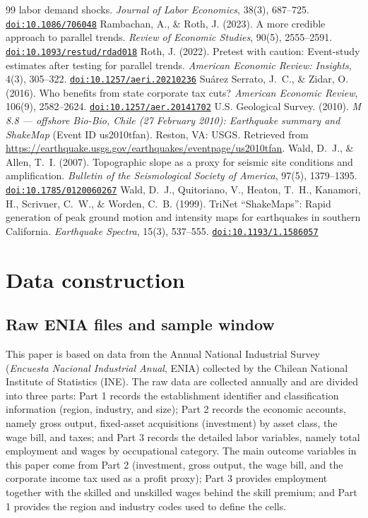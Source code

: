 \documentclass[12pt]{article}
\newcommand{\doi}[1]{\href{https://doi.org/#1}{\texttt{doi:#1}}}
\begin{document}
\begin{thebibliography}{99}
labor demand shocks. \textit{Journal of Labor Economics}, 38(3), 687--725.
\doi{10.1086/706048}
 Rambachan, A., \& Roth, J. (2023). A more
credible approach to parallel trends. \textit{Review of Economic Studies}, 90(5), 2555--2591.
\doi{10.1093/restud/rdad018}
 Roth, J. (2022). Pretest with caution: Event-study estimates
after testing for parallel trends. \textit{American Economic Review: Insights}, 4(3), 305--322.
\doi{10.1257/aeri.20210236}
 Su\'arez Serrato, J.~C., \& Zidar,
O. (2016). Who benefits from state corporate tax cuts? \textit{American Economic Review},
106(9), 2582--2624. \doi{10.1257/aer.20141702}
 U.S. Geological Survey. (2010). \textit{M 8.8 ---
offshore Bio-Bio, Chile (27 February 2010): Earthquake summary and ShakeMap} (Event ID us2010tfan). Reston, VA: USGS. Retrieved from \url{https://earthquake.usgs.gov/earthquakes/eventpage/us2010tfan}.
 Wald, D.~J., \& Allen, T.~I. (2007). Topographic
slope as a proxy for seismic site conditions and amplification. \textit{Bulletin of the
Seismological Society of America}, 97(5), 1379--1395. \doi{10.1785/0120060267}
 Wald, D.~J., Quitoriano, V., Heaton, T.~H., Kanamori, H.,
Scrivner, C.~W., \& Worden, C.~B. (1999). TriNet ``ShakeMaps'': Rapid generation of peak ground
motion and intensity maps for earthquakes in southern California. \textit{Earthquake Spectra},
15(3), 537--555. \doi{10.1193/1.1586057}
\end{thebibliography}

\clearpage
\FloatBarrier
\appendix
\section{Data construction}\label{app:data}

\subsection{Raw ENIA files and sample window}
This paper is based on data from the Annual National Industrial Survey (\textit{Encuesta Nacional
Industrial Anual}, ENIA) collected by the Chilean National Institute of Statistics (INE). The raw data are
collected annually and are divided into three parts: Part 1 records the establishment identifier and
classification information (region, industry, and size); Part 2 records the economic accounts, namely
gross output, fixed-asset acquisitions (investment) by asset class, the wage bill, and taxes; and Part 3
records the detailed labor variables, namely total employment and wages by occupational category. The
main outcome variables in this paper come from Part 2 (investment, gross output, the wage bill, and the
corporate income tax used as a profit proxy); Part 3 provides employment together with the skilled and
unskilled wages behind the skill premium; and Part 1 provides the region and industry codes used to define
the cells.
\end{document}

